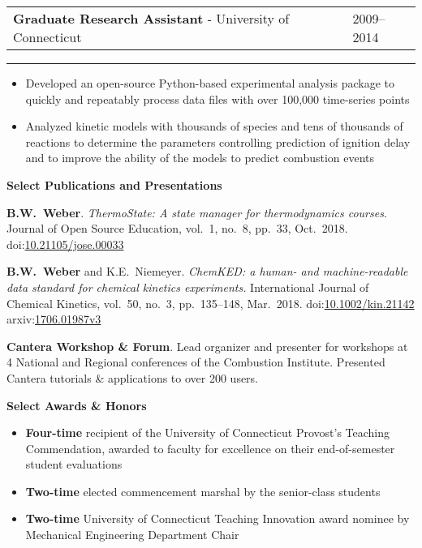 \documentclass[11pt]{article}
\newcommand{\cvsection}[1]
{
\begin{center}
    \large\textcolor{sectcol}{\textbf{#1}}
\end{center}
}
\newenvironment{cvevent}[3]{%
%
\begin{tabular*}{1\textwidth}{p{13.9cm} x{3.04cm}}%
    \textbf{#2} - \textcolor{bgcol}{#3} & \vspace{2.5pt}\textcolor{sectcol}{#1}%
\end{tabular*}%

\vspace{-8pt}%
\textcolor{softcol}{\hrule}%
\vspace{6pt}%
}{
\vspace{6pt}
}
\newcommand*{\meauthor}[1]{\textbf{#1}}
\newcommand*{\papertitle}[1]{\textit{#1}}
\newcommand{\iconspace}{\enspace}
\newcommand{\arxiv}[1]{\aiarXiv\iconspace arxiv:\href{https://arxiv.org/abs/#1}{#1}}
\newcommand{\doi}[1]{\aiDoi\iconspace doi:\href{https://doi.org/#1}{#1}}
\begin{document}
\begin{cvevent}{2009--2014}
{Graduate Research Assistant}
{University of Connecticut}
\begin{itemize}
    \item Developed an open-source Python-based experimental analysis package to quickly
    and repeatably process data files with over 100,000 time-series points
    \item Analyzed kinetic models with thousands of species and tens of thousands of
    reactions to determine the parameters controlling prediction of ignition delay and to
    improve the ability of the models to predict combustion events
\end{itemize}
\end{cvevent}

\cvsection{Select Publications and Presentations}

\meauthor{B.W.\ Weber}. \papertitle{ThermoState: A state manager for thermodynamics
courses}. Journal of Open Source Education, vol.\ 1, no.\ 8, pp.\ 33,
Oct.\ 2018.
\doi{10.21105/jose.00033}

\meauthor{B.W.\ Weber} and K.E.\ Niemeyer. \papertitle{ChemKED: a human- and
machine-readable data standard for chemical kinetics experiments.} International Journal
of Chemical Kinetics, vol.\ 50, no.\ 3, pp.\ 135--148, Mar.\ 2018.
\doi{10.1002/kin.21142} \quad \arxiv{1706.01987v3}

\textbf{Cantera Workshop \& Forum}. Lead organizer and presenter for workshops at 4
National and Regional conferences of the Combustion Institute. Presented Cantera tutorials
\& applications to over 200 users.


\cvsection{Select Awards \& Honors}

\begin{itemize}[leftmargin=*]
    \item \textbf{Four-time} recipient of the University of Connecticut Provost's Teaching
    Commendation, awarded to faculty for excellence on their end-of-semester student evaluations
    \item \textbf{Two-time} elected commencement marshal by the senior-class students
    \item \textbf{Two-time} University of Connecticut Teaching Innovation award nominee by
    Mechanical Engineering Department Chair
\end{itemize}
\end{document}
